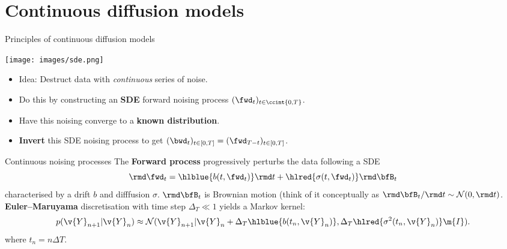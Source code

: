 \section{Continuous diffusion models}

\begin{frame}{Principles of continuous diffusion models}
\begin{center}
    \texttt{[image: images/sde.png]}
\end{center}
\vspace{-0.5em}
\begin{itemize} [triangle]
    \item Idea: Destruct data with \textit{continuous} series of noise.
    \item Do this by constructing an \textbf{SDE} forward noising process $(\fwd_t)_{t \in \ccint{0,T}}$.
    \item Have this noising converge to a \textbf{known distribution}.
    \item \textbf{Invert} this SDE noising process to get $(\bwd_t)_{t\in[0,T]} = (\fwd_{T-t})_{t\in[0,T]}$.
\end{itemize}
%
\end{frame}



\begin{frame}{Continuous noising processes}
%
The \textbf{Forward process} progressively perturbs the data following a SDE
\begin{equation}
  \label{eq:sde}
    \rmd \fwd_t = \hlblue{b(t, \fwd_t)} \rmd t + \hlred{\sigma(t, \fwd_t)} \rmd \bfB_t
\end{equation}
characterised by a drift $b$ and difffusion $\sigma$. $\rmd \bfB_t$ is Brownian
motion (think of it conceptually as $\rmd \bfB_t / \rmd t \sim \mathcal{N}(0, \rmd t)$.
\\
\pause
\vspace{0.5cm}
\textbf{Euler–Maruyama} discretisation with time step $\Delta_T \ll 1$ yields a Markov kernel: 
\begin{equation*}
     p(\v{Y}_{n+1} | \v{Y}_{n}) \approx \mathcal{N}(\v{Y}_{n+1}|\v{Y}_{n} +
     \Delta_T  \hlblue{b(t_n, \v{Y}_{n})}, { \Delta_T \hlred{\sigma^2(t_n,
     \v{Y}_n)}} \m{I}).
\end{equation*}
where $t_n = n \Delta T$.
\end{frame}

